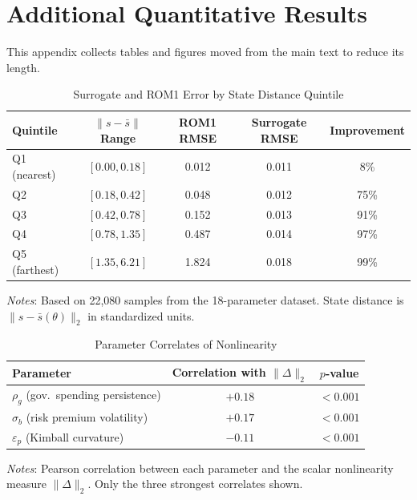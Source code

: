 \documentclass[12pt]{article}
\theoremstyle{plain}
\theoremstyle{definition}
\theoremstyle{remark}
\newcommand{\tablenotes}[1]{%
  \par\vspace{0.5em}%
  \noindent\begin{minipage}{\textwidth}%
  \raggedright\footnotesize #1%
  \end{minipage}\par%
}
\begin{document}
\section{Additional Quantitative Results}
\label{app:additional_results}

This appendix collects tables and figures moved from the main text to reduce its length.

\begin{table}[htbp]
\centering
\caption{Surrogate and ROM1 Error by State Distance Quintile}
\label{tab:error_by_distance}
\begin{tabular}{lcccc}
\toprule
Quintile & $\|s - \bar{s}\|$ Range & ROM1 RMSE & Surrogate RMSE & Improvement \\
\midrule
Q1 (nearest) & $[0.00, 0.18]$ & 0.012 & 0.011 & 8\% \\
Q2 & $[0.18, 0.42]$ & 0.048 & 0.012 & 75\% \\
Q3 & $[0.42, 0.78]$ & 0.152 & 0.013 & 91\% \\
Q4 & $[0.78, 1.35]$ & 0.487 & 0.014 & 97\% \\
Q5 (farthest) & $[1.35, 6.21]$ & 1.824 & 0.018 & 99\% \\
\bottomrule
\end{tabular}
\smallskip
\tablenotes{\textit{Notes}: Based on 22,080 samples from the 18-parameter dataset. State distance is $\|s - \bar{s}(\theta)\|_2$ in standardized units.}
\end{table}

\begin{table}[htbp]
\centering
\caption{Parameter Correlates of Nonlinearity}
\label{tab:param_nonlinearity}
\begin{tabular}{lcc}
\toprule
Parameter & Correlation with $\|\Delta\|_2$ & $p$-value \\
\midrule
$\rho_g$ (gov.\ spending persistence) & $+0.18$ & $< 0.001$ \\
$\sigma_b$ (risk premium volatility) & $+0.17$ & $< 0.001$ \\
$\varepsilon_p$ (Kimball curvature) & $-0.11$ & $< 0.001$ \\
\bottomrule
\end{tabular}
\smallskip
\tablenotes{\textit{Notes}: Pearson correlation between each parameter and the scalar nonlinearity measure $\|\Delta\|_2$. Only the three strongest correlates shown.}
\end{table}
\end{document}
